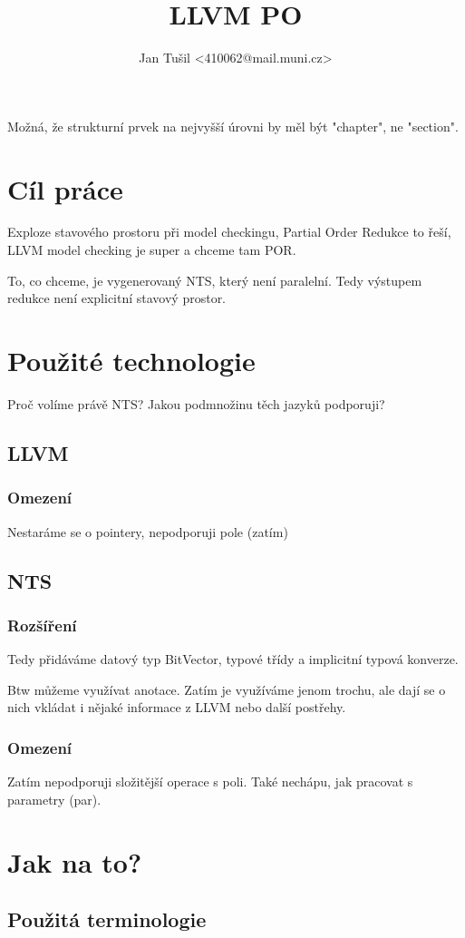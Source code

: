 \documentclass[10pt,a4paper,notitlepage]{article}
\author{Jan Tušil <410062@mail.muni.cz>}
\title{LLVM PO}
\begin{document}
Možná, že strukturní prvek na nejvyšší úrovni by měl být "chapter", ne "section".

\section{Cíl práce}
Exploze stavového prostoru při model checkingu, Partial Order Redukce to řeší,
LLVM model checking je super a chceme tam POR.

To, co chceme, je vygenerovaný NTS, který není paralelní. Tedy výstupem redukce
není explicitní stavový prostor.

\section{Použité technologie}
Proč volíme právě NTS? Jakou podmnožinu těch jazyků podporuji?
\subsection{LLVM}
\subsubsection{Omezení}
Nestaráme se o pointery, nepodporuji pole (zatím)


\subsection{NTS}
\subsubsection{Rozšíření}
Tedy přidáváme datový typ BitVector, typové třídy a implicitní typová konverze.

Btw můžeme využívat anotace. Zatím je využíváme jenom trochu, ale dají se o nich vkládat
i nějaké informace z LLVM nebo další postřehy.

\subsubsection{Omezení}
Zatím nepodporuji složitější operace s poli. Také nechápu, jak pracovat s parametry (par).

\section{Jak na to?}

\subsection{Použitá terminologie}
\end{document}
